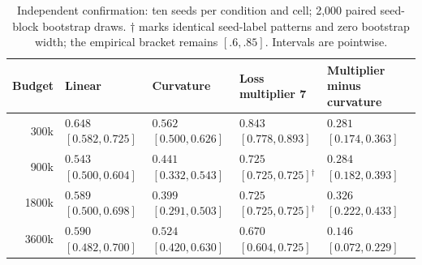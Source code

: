 \begin{table}[t]
\centering\small
\caption{Independent confirmation: ten seeds per condition and cell; 2,000 paired seed-block bootstrap draws. $\dagger$ marks identical seed-label patterns and zero bootstrap width; the empirical bracket remains $[.6,.85]$. Intervals are pointwise.}
\label{tab:confirmed_horizon}
\begin{tabular}{@{}rllll@{}}\toprule
Budget & Linear & Curvature & Loss multiplier 7 & Multiplier minus curvature \\
\midrule
300k & $0.648$ $[0.582,0.725]$ & $0.562$ $[0.500,0.626]$ & $0.843$ $[0.778,0.893]$ & $0.281$ $[0.174,0.363]$ \\
900k & $0.543$ $[0.500,0.604]$ & $0.441$ $[0.332,0.543]$ & $0.725$ $[0.725,0.725]$$^{\dagger}$ & $0.284$ $[0.182,0.393]$ \\
1800k & $0.589$ $[0.500,0.698]$ & $0.399$ $[0.291,0.503]$ & $0.725$ $[0.725,0.725]$$^{\dagger}$ & $0.326$ $[0.222,0.433]$ \\
3600k & $0.590$ $[0.482,0.700]$ & $0.524$ $[0.420,0.630]$ & $0.670$ $[0.604,0.725]$ & $0.146$ $[0.072,0.229]$ \\
\bottomrule\end{tabular}
\end{table}
